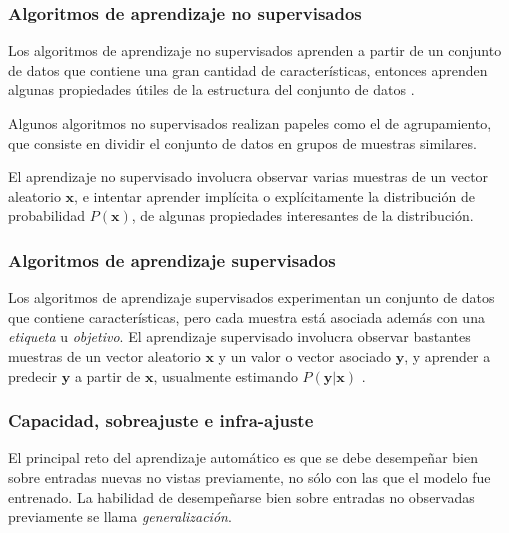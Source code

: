 \subsubsection{Algoritmos de aprendizaje no supervisados}

\begin{remark}
Los algoritmos de aprendizaje no supervisados aprenden a partir de un conjunto
de datos que contiene una gran cantidad de características, entonces aprenden algunas
propiedades útiles de la estructura del conjunto de datos \cite{iangoodfellowyoshuabengioaaroncourville2017}.  
\end{remark}

Algunos algoritmos no supervisados realizan papeles como el 
de agrupamiento, que consiste en dividir el conjunto de 
datos en grupos de muestras similares.\\


\begin{remark}
El aprendizaje no supervisado involucra observar
varias muestras de un vector aleatorio $\mathbf{x}$, e intentar aprender implícita
o explícitamente la distribución de probabilidad $P(\mathbf{x})$, de algunas
propiedades interesantes de la distribución.
\end{remark}


\subsubsection{Algoritmos de aprendizaje
supervisados}

\begin{remark}
Los algoritmos de aprendizaje supervisados experimentan un conjunto de
datos que contiene características, pero cada muestra está asociada además con
una \textit{etiqueta} u \textit{objetivo}.
El aprendizaje supervisado involucra observar bastantes muestras de un
vector aleatorio $\mathbf{x}$ y un valor o vector asociado $\mathbf{y}$, y aprender a
predecir $\mathbf{y}$ a partir de $\mathbf{x}$, usualmente estimando $P(\mathbf{y} |\mathbf{x})$ \cite{iangoodfellowyoshuabengioaaroncourville2017}.
\end{remark}



\subsubsection{Capacidad, sobreajuste e
infra-ajuste}

El principal reto del aprendizaje automático es que se debe desempeñar
bien sobre entradas nuevas no vistas previamente, no sólo con las que el
modelo fue entrenado. La habilidad de desempeñarse bien sobre entradas
no observadas previamente se llama \textit{generalización}.

